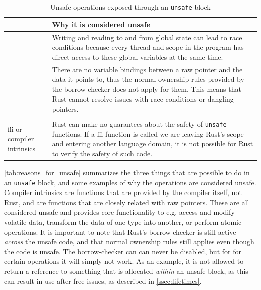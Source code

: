 \begin{table}[ht]
\begin{center}
\begin{tabular}{p{4cm}|p{7cm}}
  \raggedleft{\textbf{Unsafe Operation}} &
  \textbf{Why it is considered unsafe}} \\
  \hline
  \raggedleft{Access and update static mutable variables} &
  Writing and reading to and from global state can lead to race conditions because every thread and scope in the program has direct access to these global variables at the same time. \\

  \raggedleft{Dereference raw pointers} &
  There are no variable bindings between a raw pointer and the data it points to, thus the normal ownership rules provided by the borrow-checker does not apply for them. This means that Rust cannot resolve issues with race conditions or dangling pointers. \\

  \raggedleft{Call unsafe functions, e.g. \\ \gls{ffi} or compiler intrinsics} &
  Rust can make no guarantees about the safety of \texttt{unsafe} functions. If a \gls{ffi} function is called we are leaving Rust's scope and entering another language domain, it is not possible for Rust to verify the safety of such code. \\

\hline
\end{tabular}
\caption{Unsafe operations exposed through an \texttt{unsafe} block}
\label{tab:reasons_for_unsafe}
\end{center}
\end{table}

\autoref{tab:reasons_for_unsafe} summarizes the three things that are possible to do in an \texttt{unsafe} block, and some examples of why the operations are considered unsafe.
Compiler intrinsics are functions that are provided by the compiler itself, not Rust, and are functions that are closely related with raw pointers.
These are all considered unsafe and provides core functionality to e.g. access and modify volatile data, transform the data of one type into another, or perform atomic operations.
It is important to note that Rust's borrow checker is still active \emph{across} the unsafe code, and that normal ownership rules still applies even though the code is unsafe.
The borrow-checker can can never be disabled, but for for certain operations it will simply not work.
As an example, it is not allowed to return a reference to something that is allocated \emph{within} an unsafe block, as this can result in use-after-free issues, as described in \autoref{ssec:lifetimes}.

